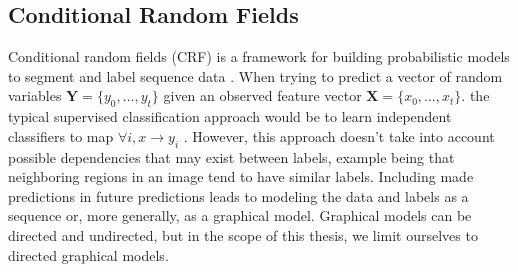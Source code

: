 \subsection{Conditional Random Fields}
\label{sec:crf}

Conditional random fields (CRF) is a framework for building probabilistic 
models to segment and label sequence data \citep{wallach2004conditional}.
When trying to predict a vector of random variables $\mathbf{Y} = \{y_0, \dots, y_t\}$
given an observed feature vector $\mathbf{X} = \{x_0, \dots, x_t\}$. 
the typical supervised classification approach would be 
to learn independent classifiers to map $\forall i,  x \to y_i$
\citep{sutton2012introduction}.
However, this approach doesn't take into account possible dependencies
that may exist between labels, example being that neighboring 
regions in an image tend to have similar labels. 
Including made predictions in future predictions leads to 
modeling the data and labels as a sequence or, more generally,
as a graphical model.
Graphical models can be directed and undirected, but 
in the scope of this thesis, we limit ourselves to 
directed graphical models. 

